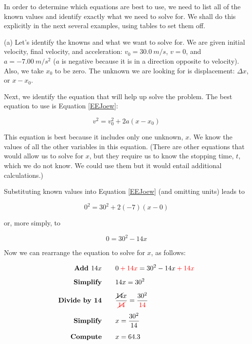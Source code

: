 \documentclass[../../main-ap-physics.tex]{subfiles}
\begin{document}
In order to determine which equations are best to use, we need to list all of the known values and identify exactly what we need to solve for. We shall do this explicitly in the next several examples, using tables to set them off.

\vspace{1em}

(a) Let's identify the knowns and what we want to solve for. We are given initial velocity, final velocity, and acceleration: $v_0 = \SI{30.0}{m/s}$, $v= 0$, and $a = \SI{-7.00}{m/s^2}$ ($a$ is negative because it is in a direction opposite to velocity). Also, we take $x_0$ to be zero. The unknown we are looking for is displacement: $\Delta x$, or $x-x_0$.

\vspace{1em}

Next, we identify the equation that will help up solve the problem. The best equation to use is Equation \eqref{EEJoew}:

\begin{equation*}
    v^2 = v_0^2 + 2a(x-x_0)
\end{equation*}

This equation is best because it includes only one unknown, $x$. We know the values of all the other variables in this equation. (There are other equations that would allow us to solve for $x$, but they require us to know the stopping time, $t$, which we do not know. We could use them but it would entail additional calculations.)

\vspace{1em}

Substituting known values into Equation \eqref{EEJoew} (and omitting units) leads to 

\begin{equation*}
    0^2 = 30^2 + 2\left(-7\right) \left(x-0\right)
\end{equation*}

or, more simply, to 

\begin{equation*}
    0 = 30^2 - 14 x
\end{equation*}

Now we can rearrange the equation to solve for $x$, as follows:

\begin{align*}
    \textbf{Add $14x$} \qquad & 0 \mathbin{\color{red} +} \textcolor{red}{14x} = 30^2 -14x \mathbin{\color{red} +} \textcolor{red}{14x}\\[1ex]
    \textbf{Simplify} \qquad & 14x = 30^2\\[1ex]
    \textbf{Divide by 14} \qquad & \frac{\cancel{14}x}{\textcolor{red}{\cancel{14}}} = \frac{30^2}{\textcolor{red}{14}}\\[1ex]
    \textbf{Simplify} \qquad & x = \frac{30^2}{14} \\[1ex]
    \textbf{Compute} \qquad & x = 64.3
\end{align*}
\end{document}
